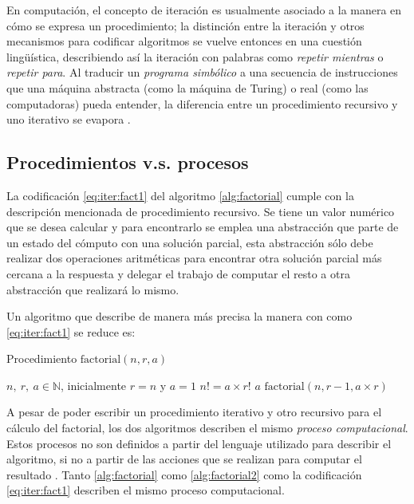 En computación, el concepto de iteración es usualmente asociado a la manera en cómo se expresa un procedimiento; la distinción entre la iteración y otros mecanismos para codificar algoritmos se vuelve entonces en una cuestión lingüística, describiendo así la iteración con palabras como \emph{repetir mientras} o \emph{repetir para}. Al traducir un \emph{programa simbólico} a una secuencia de instrucciones que una máquina abstracta (como la máquina de Turing) o real (como las computadoras) pueda entender, la diferencia entre un procedimiento recursivo y uno iterativo se evapora \cite[p.~73]{Aho:Dragon} \cite{Steele:LambdaGOTO}.

\subsection{Procedimientos v.s. procesos}
\label{sec:procedimientos-procesos}

La codificación \eqref{eq:iter:fact1} del algoritmo \ref{alg:factorial} cumple con la descripción mencionada de procedimiento recursivo. Se tiene un valor numérico que se desea calcular y para encontrarlo se emplea una abstracción que parte de un estado del cómputo con una solución parcial, esta abstracción sólo debe realizar dos operaciones aritméticas para encontrar otra solución parcial más cercana a la respuesta y delegar el trabajo de computar el resto a otra abstracción que realizará lo mismo.

Un algoritmo que describe de manera más precisa la manera con como \eqref{eq:iter:fact1} se reduce es:

\begin{algorithm}
  \caption{Procedimiento \( \mathrm{factorial}(n,r,a) \)}
  \label{alg:factorial2}
  \begin{algorithmic}
    \REQUIRE \( n,\ r,\ a\in \mathbb{N} \), inicialmente \( r=n \) y \( a=1 \)
    \ENSURE \( n! = a\times r! \)
    \RETURN \( a \)
    \ELSE
    \RETURN \( \mathrm{factorial}(n,r-1,a\times r) \)
    \ENDIF
  \end{algorithmic}
\end{algorithm}

A pesar de poder escribir un procedimiento iterativo y otro recursivo para el cálculo del factorial, los dos algoritmos describen el mismo \emph{proceso computacional}. Estos procesos no son definidos a partir del lenguaje utilizado para describir el algoritmo, si no a partir de las acciones que se realizan para computar el resultado \cite{AbelsonSussman:Wizard}. Tanto \ref{alg:factorial} como \ref{alg:factorial2} como la codificación \eqref{eq:iter:fact1} describen el mismo proceso computacional.

